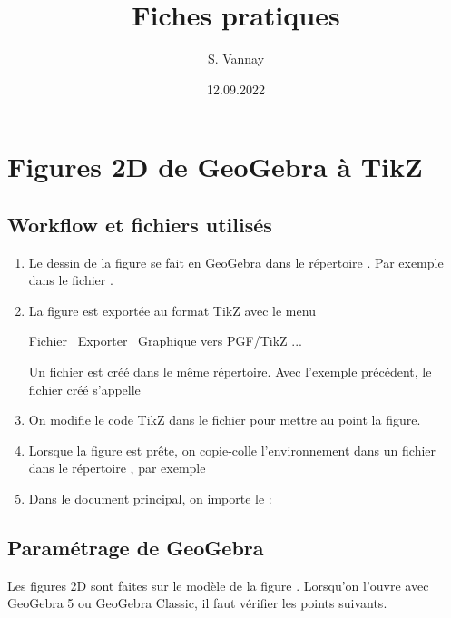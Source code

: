 \documentclass[10pt,a4paper]{report}
\title{Fiches pratiques}
\author{S. Vannay}
\date{12.09.2022}
\begin{document}
\chapterFormat
\chapter*{Figures 2D de GeoGebra à TikZ}





\section{Workflow et fichiers utilisés}

\begin{enumerate}
	\item Le dessin de la figure se fait en GeoGebra dans le répertoire . Par exemple dans le fichier .
	\item La figure est exportée au format TikZ avec le menu
		\begin{center}
			Fichier \textrightarrow \ Exporter \textrightarrow \ Graphique vers PGF/TikZ ... 
		\end{center}
		Un fichier  est créé dans le même répertoire. Avec l'exemple précédent, le fichier créé s'appelle \newline 
	\item On modifie le code TikZ dans le fichier  pour mettre au point la figure.
	\item Lorsque la figure est prête, on copie-colle l'environnement  dans un fichier  dans le répertoire , par exemple 
	\item Dans le document principal, on importe le  :
		\begin{center}
		\end{center}
\end{enumerate}





\section{Paramétrage de GeoGebra}

Les figures 2D sont faites sur le modèle de la figure . Lorsqu'on l'ouvre avec GeoGebra 5 ou GeoGebra Classic, il faut vérifier les points suivants.
\end{document}
